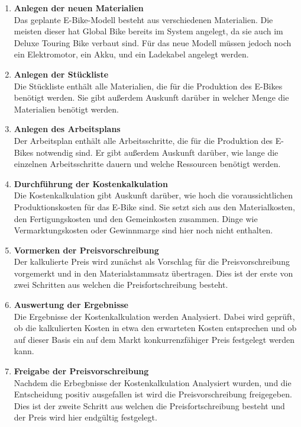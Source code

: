 \begin{enumerate}
    \item \textbf{Anlegen der neuen Materialien}\\
    Das geplante E-Bike-Modell besteht aus verschiedenen Materialien. Die meisten dieser hat Global Bike bereits im System angelegt, da sie auch im Deluxe Touring Bike verbaut sind. Für das neue Modell müssen jedoch noch ein Elektromotor, ein Akku, und ein Ladekabel angelegt werden.
    \item \textbf{Anlegen der Stückliste}\\
    Die Stückliste enthält alle Materialien, die für die Produktion des E-Bikes benötigt werden. Sie gibt außerdem Auskunft darüber in welcher Menge die Materialien benötigt werden.
    \item \textbf{Anlegen des Arbeitsplans}\\
    Der Arbeitsplan enthält alle Arbeitsschritte, die für die Produktion des E-Bikes notwendig sind. Er gibt außerdem Auskunft darüber, wie lange die einzelnen Arbeitsschritte dauern und welche Ressourcen benötigt werden.
    \item \textbf{Durchführung der Kostenkalkulation}\\
    Die Kostenkalkulation gibt Auskunft darüber, wie hoch die voraussichtlichen Produktionskosten für das E-Bike sind. Sie setzt sich aus den Materialkosten, den Fertigungskosten und den Gemeinkosten zusammen. Dinge wie Vermarktungskosten oder Gewinnmarge sind hier noch nicht enthalten.
    \item \textbf{Vormerken der Preisvorschreibung}\\
    Der kalkulierte Preis wird zunächst als Vorschlag für die Preisvorschreibung vorgemerkt und in den Materialstammsatz übertragen. Dies ist der erste von zwei Schritten aus welchen die Preisfortschreibung besteht.
    \item \textbf{Auswertung der Ergebnisse}\\
    Die Ergebnisse der Kostenkalkulation werden Analysiert. Dabei wird geprüft, ob die kalkulierten Kosten in etwa den erwarteten Kosten entsprechen und ob auf dieser Basis ein auf dem Markt konkurrenzfähiger Preis festgelegt werden kann.
    \item \textbf{Freigabe der Preisvorschreibung}\\
    Nachdem die Erbegbnisse der Kostenkalkulation Analysiert wurden, und die Entscheidung positiv ausgefallen ist wird die Preisvorschreibung freigegeben. Dies ist der zweite Schritt aus welchen die Preisfortschreibung besteht und der Preis wird hier endgültig festgelegt.
\end{enumerate}
    
